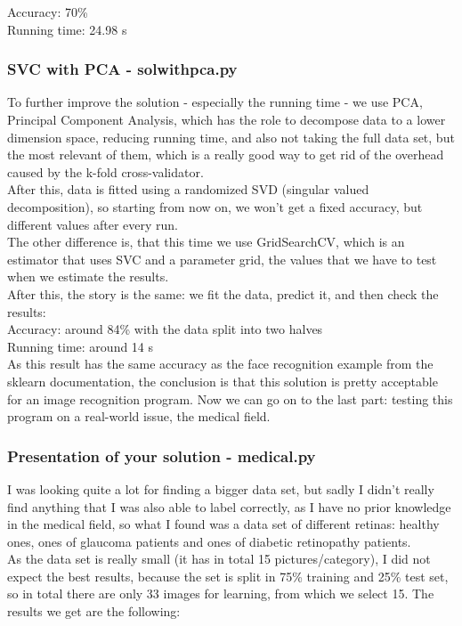 \documentclass[a4paper,10pt]{article}
\newcommand\tab[1][0.5cm]{\hspace*{#1}}
\begin{document}
  Accuracy: 70\% \\
  \tab Running time: 24.98 s
  
  \subsubsection{SVC with PCA - solwithpca.py}
  
  \tab To further improve the solution - especially the running time - we use PCA, Principal Component Analysis, which has the role to decompose data to a lower dimension space, reducing running time, and also not taking the full data set, but the most relevant of them, which is a really good way to get rid of the overhead caused by the k-fold cross-validator. \\
  \tab After this, data is fitted using a randomized SVD (singular valued decomposition), so starting from now on, we won't get a fixed accuracy, but different values after every run. \\
  \tab The other difference is, that this time we use GridSearchCV, which is an estimator that uses SVC and a parameter grid, the values that we have to test when we estimate the results. \\
  \tab After this, the story is the same: we fit the data, predict it, and then check the results: \\ 
  
  Accuracy: around 84\% with the data split into two halves \\
  \tab Running time: around 14 s \\ 
  
  \tab As this result has the same accuracy as the face recognition example from the sklearn documentation, the conclusion is that this solution is pretty acceptable for an image recognition program. Now we can go on to the last part: testing this program on a real-world issue, the medical field.
  
  \subsubsection{Presentation of your solution - medical.py}

    \tab I was looking quite a lot for finding a bigger data set, but sadly I didn't really find anything that I was also able to label correctly, as I have no prior knowledge in the medical field, so what I found was a data set of different retinas: healthy ones, ones of glaucoma patients and ones of diabetic retinopathy patients. \\ 
    \tab As the data set is really small (it has in total 15 pictures/category), I did not expect the best results, because the set is split in 75\% training and 25\% test set, so in total there are only 33 images for learning, from which we select 15. The results we get are the following: \\
    
\end{document}
